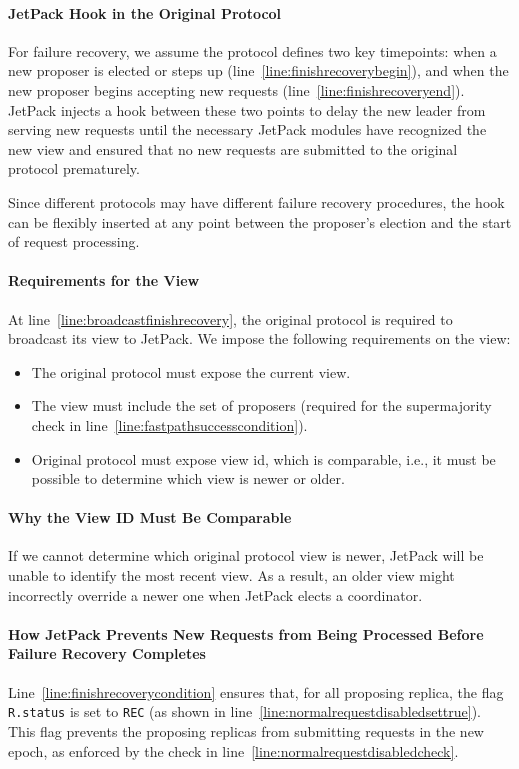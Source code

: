 \documentclass[twocolumn]{article}
\begin{document}
\paragraph{JetPack Hook in the Original Protocol}  
For failure recovery, we assume the protocol defines two key timepoints: when a new proposer is elected or steps up (line~\ref{line:finishrecoverybegin}), and when the new proposer begins accepting new requests (line~\ref{line:finishrecoveryend}). JetPack injects a hook between these two points to delay the new leader from serving new requests until the necessary JetPack modules have recognized the new view and ensured that no new requests are submitted to the original protocol prematurely.

Since different protocols may have different failure recovery procedures, the hook can be flexibly inserted at any point between the proposer’s election and the start of request processing.

\paragraph{Requirements for the View}  
At line~\ref{line:broadcastfinishrecovery}, the original protocol is required to broadcast its view to JetPack. We impose the following requirements on the view:

\begin{itemize}
    \setlength{\itemsep}{0pt}
    \item The original protocol must expose the current view.
    \item The view must include the set of proposers (required for the supermajority check in line~\ref{line:fastpathsuccesscondition}).
    \item Original protocol must expose view id, which is comparable, i.e., it must be possible to determine which view is newer or older.
\end{itemize}


\paragraph{Why the View ID Must Be Comparable}  
If we cannot determine which original protocol view is newer, JetPack will be unable to identify the most recent view. As a result, an older view might incorrectly override a newer one when JetPack elects a coordinator.

\paragraph{How JetPack Prevents New Requests from Being Processed Before Failure Recovery Completes}  
Line~\ref{line:finishrecoverycondition} ensures that, for all proposing replica, the flag \texttt{R.status} is set to \texttt{REC} (as shown in line~\ref{line:normalrequestdisabledsettrue}). This flag prevents the proposing replicas from submitting requests in the new epoch, as enforced by the check in line~\ref{line:normalrequestdisabledcheck}.
\end{document}
